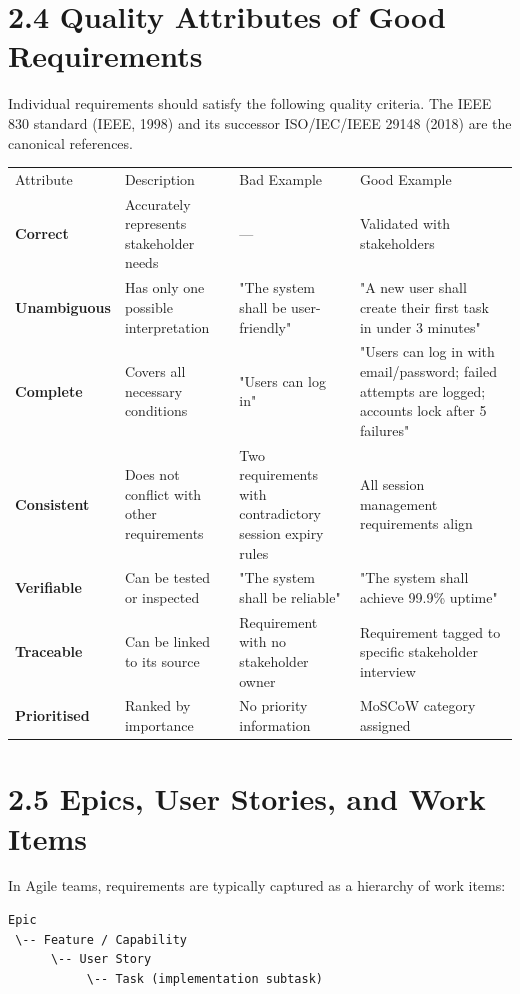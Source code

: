 \documentclass[11pt,a4paper]{book}
\begin{document}
\medskip

\section{2.4 Quality Attributes of Good Requirements}

Individual requirements should satisfy the following quality criteria. The IEEE 830 standard (IEEE, 1998) and its successor ISO/IEC/IEEE 29148 (2018) are the canonical references.

\begin{tabular}{llll}
\hline
Attribute & Description & Bad Example & Good Example \\
\textbf{Correct} & Accurately represents stakeholder needs & --- & Validated with stakeholders \\
\textbf{Unambiguous} & Has only one possible interpretation & "The system shall be user-friendly" & "A new user shall create their first task in under 3 minutes" \\
\textbf{Complete} & Covers all necessary conditions & "Users can log in" & "Users can log in with email/password; failed attempts are logged; accounts lock after 5 failures" \\
\textbf{Consistent} & Does not conflict with other requirements & Two requirements with contradictory session expiry rules & All session management requirements align \\
\textbf{Verifiable} & Can be tested or inspected & "The system shall be reliable" & "The system shall achieve 99.9\% uptime" \\
\textbf{Traceable} & Can be linked to its source & Requirement with no stakeholder owner & Requirement tagged to specific stakeholder interview \\
\textbf{Prioritised} & Ranked by importance & No priority information & MoSCoW category assigned \\
\hline
\end{tabular}

\medskip

\section{2.5 Epics, User Stories, and Work Items}

In Agile teams, requirements are typically captured as a hierarchy of work items:

\begin{lstlisting}
Epic
 \-- Feature / Capability
      \-- User Story
           \-- Task (implementation subtask)
\end{lstlisting}
\end{document}
